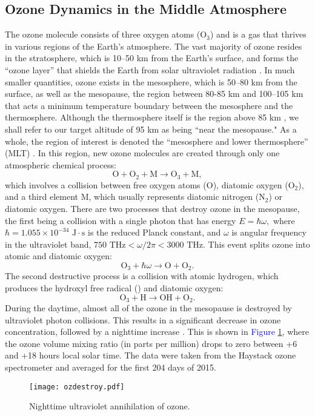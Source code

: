 \documentclass[11pt]{article}
\begin{document}
\subsection{Ozone Dynamics in the Middle Atmosphere}
The ozone molecule consists of three oxygen atoms ($\text{O}_3$) and is a gas that thrives in various regions of the Earth's atmosphere. The vast majority of ozone resides in the stratosphere, which is 10--50 km from the Earth's surface, and forms the ``ozone layer'' that shields the Earth from solar ultraviolet radiation \cite{OzoneBook}. In much smaller quantities, ozone exists in the mesosphere, which is 50--80 km from the surface, as well as the mesopause, the region between 80-85 km and 100--105 km \cite{Gerding2008} that acts a minimum temperature boundary between the mesosphere and the thermosphere. Although the thermosphere itself is the region above 85 km \cite{IUPAC2014}, we shall refer to our target altitude of 95 km as being ``near the mesopause." As a whole, the region of interest is denoted the ``mesosphere and lower thermosphere'' (MLT) \cite{Davis2013}\cite{Sandford2010}. In this region, new ozone molecules are created through only one atmospheric chemical process:
	\begin{equation}
		\text{O} + \text{O}_2 + \text{M} \rightarrow \text{O}_3 + \text{M},
	\end{equation}
which involves a collision between free oxygen atoms ($\text{O}$), diatomic oxygen ($\text{O}_2$), and a third element $\text{M}$, which usually represents diatomic nitrogen ($\text{N}_2$) or diatomic oxygen. There are two processes that destroy ozone in the mesopause, the first being a collision with a single photon that has energy $E=\hbar\omega,$ where $\hbar = 1.055\times 10^{-34}\text{ J}\cdot\text{s}$ is the reduced Planck constant, and $\omega$ is angular frequency in the ultraviolet band, $750\text{ THz}<\omega/2\pi<3000\text{ THz}$. This event splits ozone into atomic and diatomic oxygen:
	\begin{equation}
		\text{O}_3 + \hbar\omega \rightarrow \text{O} + \text{O}_2.
	\end{equation}
The second destructive process is a collision with atomic hydrogen, which produces the hydroxyl free radical () and diatomic oxygen:
	\begin{equation}
		\text{O}_3 + \text{H} \rightarrow \text{OH} + \text{O}_2. 
	\end{equation}
During the daytime, almost all of the ozone in the mesopause is destroyed by ultraviolet photon collisions. This results in a significant decrease in ozone concentration, followed by a nighttime increase \cite{Rogers2009}\cite{Rogers2012}\cite{VSRT40}\cite{VSRT58}. This is shown in \textcolor{blue}{Figure} \ref{ozdestroy}, where the ozone volume mixing ratio (in parts per million) drops to zero between +6 and +18 hours local solar time. The data were taken from the Haystack ozone spectrometer and averaged for the first 204 days of 2015.
	\begin{figure}[t]
		\centering
		\texttt{[image: ozdestroy.pdf]}
		\caption{Nighttime ultraviolet annihilation of ozone.}
		\label{ozdestroy}
	\end{figure}
\end{document}
